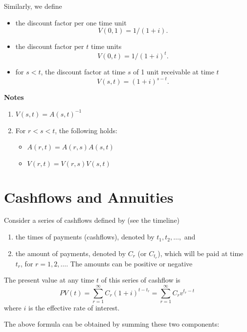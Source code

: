 \documentclass[
]{book}
\theoremstyle{definition}
\theoremstyle{definition}
\theoremstyle{definition}
\theoremstyle{definition}
\theoremstyle{remark}
\begin{document}
Similarly, we define

\begin{itemize}
\item
  the discount factor per one time unit \[V(0,1) = 1/(1 + i).\]
\item
  the discount factor per \(t\) time units \[V(0,t) = 1/(1 + i)^t.\]
\item
  for \(s < t\), the discount factor at time \(s\) of 1 unit receivable at
  time \(t\) \[V(s,t) =  (1 + i)^{s - t}.\]
\end{itemize}

\textbf{Notes}

\begin{enumerate}
\def\labelenumi{\arabic{enumi}.}
\item
  \(V(s,t) = A(s,t)^{-1}\)
\item
  For \(r < s < t\), the following holds:

  \begin{itemize}
  \item
    \(A(r,t) = A(r,s) A(s,t)\)
  \item
    \(V(r,t) = V(r,s) V(s,t)\)
  \end{itemize}
\end{enumerate}

\hypertarget{cashflows-and-annuities}{%
\section{Cashflows and Annuities}\label{cashflows-and-annuities}}

Consider a series of cashflows defined by (see the timeline)

\begin{enumerate}
\def\labelenumi{\arabic{enumi}.}
\item
  the times of payments (cashflows), denoted by \(t_1, t_2, \ldots,\)
  and
\item
  the amount of payments, denoted by \(C_{r}\) (or \(C_{t_r}\)), which
  will be paid at time \(t_r\), for \(r = 1,2, \ldots\). The amounts can
  be positive or negative
\end{enumerate}

The present value at any time \(t\) of this series of cashflow is
\[PV(t) = \sum_{r=1}^\infty C_r (1 + i)^{t - t_r} = \sum_{r=1}^\infty C_r v^{t _r - t}\]
where \(i\) is the effective rate of interest.

The above formula can be obtained by summing these two components:
\end{document}
